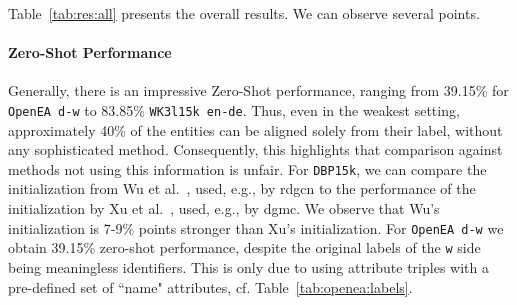 \documentclass[runningheads]{llncs}
\begin{document}
Table~\ref{tab:res:all} presents the overall results.
We can observe several points.

\paragraph{Zero-Shot Performance}
Generally, there is an impressive Zero-Shot performance, ranging from 39.15\% for \texttt{OpenEA d-w} to 83.85\% \texttt{WK3l15k en-de}.
Thus, even in the weakest setting, approximately 40\% of the entities can be aligned solely from their label, without any sophisticated method.
Consequently, this highlights that comparison against methods not using this information is unfair.
For \texttt{DBP15k}, we can compare the initialization from Wu et al.~\cite{DBLP:conf/ijcai/WuLF0Y019}, used, e.g., by \acrshort{rdgcn} to the performance of the initialization by Xu et al.~\cite{DBLP:conf/iclr/FeyL0MK20}, used, e.g., by \acrshort{dgmc}.
We observe that Wu's initialization is 7-9\% points stronger than Xu's initialization.
For \texttt{OpenEA d-w} we obtain 39.15\% zero-shot performance, despite the original labels of the \texttt{w} side being meaningless identifiers.
This is only due to using attribute triples with a pre-defined set of ``name" attributes, cf. Table~\ref{tab:openea:labels}.
\end{document}
